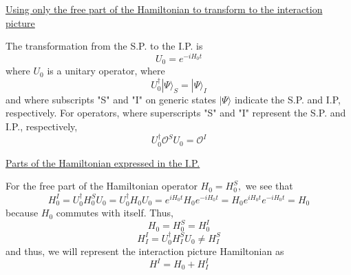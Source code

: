 \underline{Using only the free part of the Hamiltonian to transform to the interaction picture}

The transformation from the S.P. to the I.P. is
\begin{equation}
    U_{0}=e^{-i H_{0} t}
\end{equation}
where $U_0$ is a unitary operator, where
\begin{equation}
U_{0}^{\dagger}|\Psi\rangle_{S}=|\Psi\rangle_{I}
\end{equation}
and where subscripts "S" and "I" on generic states $|\Psi\rangle$ indicate the S.P. and I.P, respectively. For operators, where superscripts "S" and "I" represent the S.P. and I.P., respectively,
\begin{equation}
U_{0}^{\dagger} \mathcal{O}^{S} U_{0}=\mathcal{O}^{I}
\end{equation}

\underline{Parts of the Hamiltonian expressed in the I.P.}

For the free part of the Hamiltonian operator $H_{0}=H_{0}^{S},$ we see that
\begin{equation}
H_{0}^{I}=U_{0}^{\dagger} H_{0}^{S} U_{0}=U_{0}^{\dagger} H_{0} U_{0}=e^{i H_{0} t} H_{0} e^{-i H_{0} t}=H_{0} e^{i H_{0} t} e^{-i H_{0} t}=H_{0}
\end{equation}
because $H_{0}$ commutes with itself. Thus,
\begin{equation}
H_{0}=H_{0}^{S}=H_{0}^{I}
\end{equation}
$$
H_{I}^{I}=U_{0}^{\dagger} H_{I}^{S} U_{0} \neq H_{I}^{S}
$$
and thus, we will represent the interaction picture Hamiltonian as
\begin{equation}
H^{I}=H_{0}+H_{I}^{I}
\end{equation}
